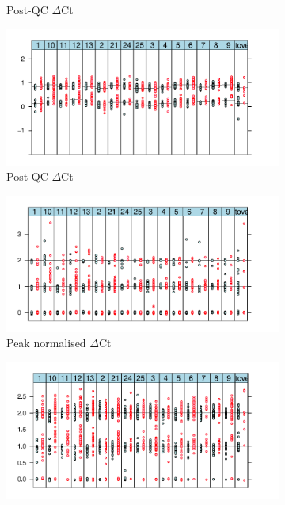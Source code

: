 \begin{figure}[!h]
\begin{subfigure}[b]{.4\textwidth}
    \caption{Post-QC  $\Delta$Ct}
    \label{}
    \end{subfigure}
    \begin{subfigure}[b]{.4\textwidth}
    \includegraphics[scale=.5] {KIR/figures/KIR3DL1-postQC.pdf}
    \caption{Post-QC  $\Delta$Ct}
    \label{}
    \end{subfigure}
    \begin{subfigure}[b]{.4\textwidth}
    \includegraphics[scale=.5] {KIR/figures/KIR3DS1-peaknormalised.pdf}
    \caption{Peak normalised  $\Delta$Ct}
    \label{}
    \end{subfigure}
    \hspace{3cm}
    \begin{subfigure}[b]{.4\textwidth}
    \includegraphics[scale=.5] {KIR/figures/KIR3DL1-peaknormalised.pdf}

\end{subfigure}
\end{figure}
